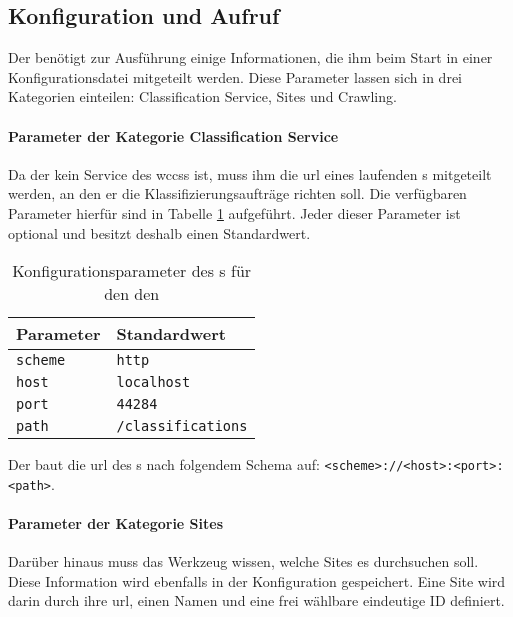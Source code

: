 \subsection{Konfiguration und Aufruf}
    Der {\wordpressCrawler} benötigt zur Ausführung einige Informationen,
    die ihm beim Start in einer Konfigurationsdatei mitgeteilt werden.
    Diese Parameter lassen sich in drei Kategorien einteilen:
    Classification Service, Sites und Crawling.

    \paragraph{Parameter der Kategorie Classification Service}
    Da der {\wordpressCrawler} kein Service des \glspl{wccs} ist,
    muss ihm die \gls{url} eines laufenden {\classificationService}s mitgeteilt werden,
    an den er die Klassifizierungsaufträge richten soll.
    Die verfügbaren Parameter hierfür sind in Tabelle \ref{table:crawlerClassificationServiceParameter} aufgeführt.
    Jeder dieser Parameter ist optional und besitzt deshalb einen Standardwert.

    \begin{table}[]
        \centering
        \begin{tabular}{|l|l|}
            \hline
            \textbf{Parameter} & \textbf{Standardwert}\\
            \hline
            \texttt{scheme} & \texttt{http} \\
            \hline
            \texttt{host} & \texttt{localhost} \\
            \hline
            \texttt{port} & \texttt{44284} \\
            \hline
            \texttt{path} & \texttt{/classifications} \\
            \hline
            \end{tabular}
        \caption{Konfigurationsparameter des {\wordpressCrawler}s für den den {\classificationService}}
        \label{table:crawlerClassificationServiceParameter}
    \end{table}

    Der {\wordpressCrawler} baut die \gls{url} des {\classificationService}s nach
    folgendem Schema auf: \texttt{<scheme>://<host>:<port>:<path>}.

    \paragraph{Parameter der Kategorie Sites}
    Darüber hinaus muss das Werkzeug wissen,
    welche {\wordpress} Sites es durchsuchen soll.
    Diese Information wird ebenfalls in der Konfiguration gespeichert.
    Eine {\wordpress} Site wird darin durch
    ihre \gls{url}, einen Namen und eine frei wählbare eindeutige ID definiert.


